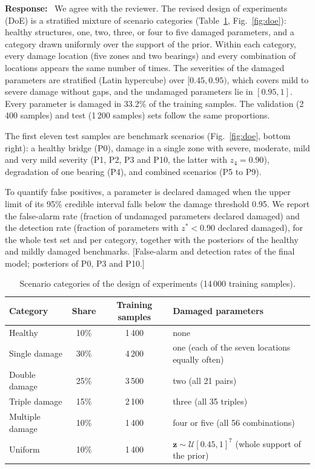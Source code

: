 \documentclass[11pt]{article}
\newenvironment{response}{\par\smallskip\noindent\color{resp}\textbf{Response:}\ }{\par}
\newcommand{\tbd}[1]{\textcolor{note}{\textsf{[#1]}}}
\newcommand{\z}{\mathbf{z}}
\begin{document}
\begin{response}
We agree with the reviewer. The revised design of experiments (DoE) is a stratified mixture of scenario categories
(Table~\ref{tab:doe}, Fig.~\ref{fig:doe}): healthy structures, one, two, three, or four to five damaged parameters, and a
category drawn uniformly over the support of the prior. Within each category, every damage location (five zones and two
bearings) and every combination of locations appears the same number of times. The severities of the damaged
parameters are stratified (Latin hypercube) over $[0.45,0.95)$, which covers mild to severe damage without gaps, and
the undamaged parameters lie in $[0.95,1]$. Every parameter is damaged in 33.2\% of the training samples. The validation
(2\,400 samples) and test (1\,200 samples) sets follow the same proportions.

The first eleven test samples are benchmark scenarios (Fig.~\ref{fig:doe}, bottom right): a healthy bridge (P0),
damage in a single zone with severe, moderate, mild and very mild severity (P1, P2, P3 and P10, the latter with
$z_4=0.90$), degradation of one bearing (P4), and combined scenarios (P5 to P9).

To quantify false positives, a parameter is declared damaged when the upper limit of its 95\% credible interval falls
below the damage threshold 0.95. We report the false-alarm rate (fraction of undamaged parameters declared damaged)
and the detection rate (fraction of parameters with $z^*<0.90$ declared damaged), for the whole test set and per
category, together with the posteriors of the healthy and mildly damaged benchmarks.
\tbd{False-alarm and detection rates of the final model; posteriors of P0, P3 and P10.}
\end{response}

\begin{table}[H]
\centering\small
\caption{Scenario categories of the design of experiments (14\,000 training samples).}
\label{tab:doe}
\begin{tabular}{lccl}
\toprule
Category & Share & Training samples & Damaged parameters \\
\midrule
Healthy & 10\% & 1\,400 & none \\
Single damage & 30\% & 4\,200 & one (each of the seven locations equally often) \\
Double damage & 25\% & 3\,500 & two (all 21 pairs) \\
Triple damage & 15\% & 2\,100 & three (all 35 triples) \\
Multiple damage & 10\% & 1\,400 & four or five (all 56 combinations) \\
Uniform & 10\% & 1\,400 & $\z\sim\mathcal{U}[0.45,1]^7$ (whole support of the prior) \\
\bottomrule
\end{tabular}
\end{table}
\end{document}
